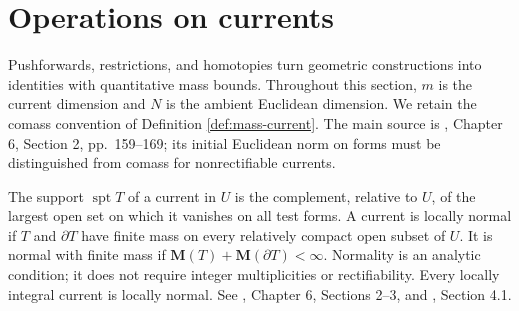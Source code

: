 \chapter{Operations on currents}\label{sec:current-operations}
Pushforwards, restrictions, and homotopies turn geometric constructions into identities with quantitative mass bounds. Throughout this section, $m$ is the current dimension and $N$ is the ambient Euclidean dimension. We retain the comass convention of Definition \ref{def:mass-current}. The main source is \cite{Sim18}, Chapter 6, Section 2, pp.~159--169; its initial Euclidean norm on forms must be distinguished from comass for nonrectifiable currents.

\begin{definition}\label{def:normal-current}
The support $\operatorname{spt}T$ of a current in $U$ is the complement, relative to $U$, of the largest open set on which it vanishes on all test forms. A current is locally normal if $T$ and $\partial T$ have finite mass on every relatively compact open subset of $U$. It is normal with finite mass if $\mathbf M(T)+\mathbf M(\partial T)<\infty$. Normality is an analytic condition; it does not require integer multiplicities or rectifiability. Every locally integral current is locally normal. See \cite{Sim18}, Chapter 6, Sections 2--3, and \cite{Fed69}, Section 4.1.
\end{definition}

